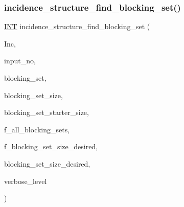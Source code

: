\subsubsection{\texorpdfstring{incidence\+\_\+structure\+\_\+find\+\_\+blocking\+\_\+set()}{incidence\_structure\_find\_blocking\_set()}}
{\footnotesize\ttfamily \mbox{\hyperlink{galois_8h_a09fddde158a3a20bd2dcadb609de11dc}{I\+NT}} incidence\+\_\+structure\+\_\+find\+\_\+blocking\+\_\+set (\begin{DoxyParamCaption}\item[{\mbox{\hyperlink{classincidence__structure}{incidence\+\_\+structure}} $\ast$}]{Inc,  }\item[{\mbox{\hyperlink{galois_8h_a09fddde158a3a20bd2dcadb609de11dc}{I\+NT}}}]{input\+\_\+no,  }\item[{\mbox{\hyperlink{galois_8h_a09fddde158a3a20bd2dcadb609de11dc}{I\+NT}} $\ast$}]{blocking\+\_\+set,  }\item[{\mbox{\hyperlink{galois_8h_a09fddde158a3a20bd2dcadb609de11dc}{I\+NT}} \&}]{blocking\+\_\+set\+\_\+size,  }\item[{\mbox{\hyperlink{galois_8h_a09fddde158a3a20bd2dcadb609de11dc}{I\+NT}}}]{blocking\+\_\+set\+\_\+starter\+\_\+size,  }\item[{\mbox{\hyperlink{galois_8h_a09fddde158a3a20bd2dcadb609de11dc}{I\+NT}}}]{f\+\_\+all\+\_\+blocking\+\_\+sets,  }\item[{\mbox{\hyperlink{galois_8h_a09fddde158a3a20bd2dcadb609de11dc}{I\+NT}}}]{f\+\_\+blocking\+\_\+set\+\_\+size\+\_\+desired,  }\item[{\mbox{\hyperlink{galois_8h_a09fddde158a3a20bd2dcadb609de11dc}{I\+NT}}}]{blocking\+\_\+set\+\_\+size\+\_\+desired,  }\item[{\mbox{\hyperlink{galois_8h_a09fddde158a3a20bd2dcadb609de11dc}{I\+NT}}}]{verbose\+\_\+level }\end{DoxyParamCaption})}

